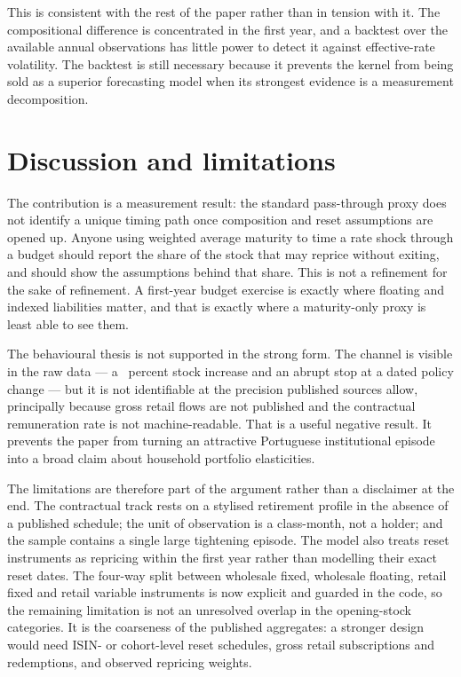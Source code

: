 \documentclass[11pt,a4paper]{article}
\begin{document}
This is consistent with the rest of the paper rather than in tension with it.
The compositional difference is concentrated in the first year, and a backtest over
the available annual observations has little power to detect it against
effective-rate volatility. The backtest is still necessary because it prevents
the kernel from being sold as a superior forecasting model when its strongest
evidence is a measurement decomposition.

\section{Discussion and limitations}
\label{sec:discussion}

The contribution is a measurement result: the standard pass-through proxy does
not identify a unique timing path once composition and reset assumptions are
opened up. Anyone using weighted average maturity to time a rate shock through
a budget should report the share of the stock that may reprice without exiting,
and should show the assumptions behind that share. This is not a refinement for
the sake of refinement. A first-year budget exercise is exactly where floating
and indexed liabilities matter, and that is exactly where a maturity-only proxy
is least able to see them.

The behavioural thesis is not supported in the strong form. The channel is
visible in the raw data --- a \RetailGrowthPct\ percent stock increase and an
abrupt stop at a dated policy change --- but it is not identifiable at the
precision published sources allow, principally because gross retail flows are
not published and the contractual remuneration rate is not machine-readable.
That is a useful negative result. It prevents the paper from turning an
attractive Portuguese institutional episode into a broad claim about household
portfolio elasticities.

The limitations are therefore part of the argument rather than a disclaimer at
the end. The contractual track rests on a stylised retirement profile in the
absence of a published schedule; the unit of observation is a class-month, not
a holder; and the sample contains a single large tightening episode. The model
also treats reset instruments as repricing within the first year rather than
modelling their exact reset dates. The four-way split between wholesale fixed,
wholesale floating, retail fixed and retail variable instruments is now
explicit and guarded in the code, so the remaining limitation is not an
unresolved overlap in the opening-stock categories. It is the coarseness of the
published aggregates: a stronger design would need ISIN- or cohort-level reset
schedules, gross retail subscriptions and redemptions, and observed repricing
weights.
\end{document}
